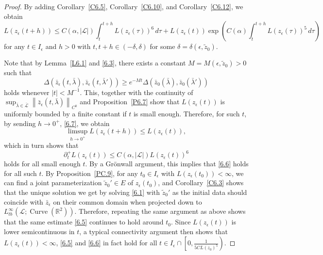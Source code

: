 \documentclass[reqno,centertags,12pt]{amsart}
\theoremstyle{definition}
\numberwithin{equation}{section}
\newcommand{\abs}[1]{\left\lvert#1\right\rvert}
\newcommand{\norm}[1]{\left\|#1\right\|}
\newcommand{\bbR}{{\mathbb{R}}}
\begin{document}
\begin{proof}
    By adding Corollary~\ref{C6.5},
    Corollary~\ref{C6.10}, and
    Corollary~\ref{C6.12}, we obtain
    \begin{equation}\label{6.7}
        L(z_{\epsilon}(t+h)) \leq
        C(\alpha,\abs{\mathcal{L}})\int_{t}^{t+h}L(z_{\epsilon}(\tau))^{6}\,d\tau
        + L(z_{\epsilon}(t))
        \exp\left(C(\alpha)\int_{t}^{t+h}L(z_{\epsilon}(\tau))^{5}\,d\tau\right)
    \end{equation}
    for any $t\in I_{\epsilon}$ and $h>0$ with
    $t,t+h\in (-\delta,\delta)$ for some $\delta=\delta(\epsilon,\tilde{z}_{0})$.

    Note that by Lemma~\ref{L6.1}
    and \eqref{6.3}, there exists a constant
    $M=M(\epsilon,\tilde{z}_{0})>0$ such that
    \[
        \Delta(\bar{z}_{\epsilon}(t,\bar{\lambda}),\bar{z}_{\epsilon}(t,\bar{\lambda}'))
        \geq e^{-Mt}
        \Delta(\bar{z}_{0}(\bar{\lambda}),\bar{z}_{0}(\bar{\lambda}'))
    \]
    holds whenever $\abs{t}<M^{-1}$. This, together with
    the continuity of $\sup_{\bar{\lambda}\in\bar{\mathcal{L}}}
    \norm{\bar{z}_{\epsilon}(t,\bar{\lambda})}_{C^{0}}$ and
    Proposition~\ref{P6.7} show that
    $L(z_{\epsilon}(t))$ is uniformly bounded by a finite constant
    if $t$ is small enough. Therefore, for such $t$, by sending $h\to 0^{+}$,
    \eqref{6.7}, we obtain
    \[
        \limsup_{h\to 0^{+}}L(z_{\epsilon}(t+h)) \leq L(z_{\epsilon}(t)),
    \]
    which in turn shows that
    \[
        \partial_{t}^{+}L(z_{\epsilon}(t))
        \leq C(\alpha,\abs{\mathcal{L}})L(z_{\epsilon}(t))^{6}
    \]
    holds for all small enough $t$. By a Gr\"{o}nwall argument, this implies that
    \eqref{6.6} holds for all such $t$.
    By Proposition~\ref{PC.9}, for any $t_{0}\in I_{\epsilon}$ with
    $L(z_{\epsilon}(t_{0})) < \infty$, we can find a joint parameterization
    $\tilde{z}_{0}'\in E$ of $z_{\epsilon}(t_{0})$, and
    Corollary~\ref{C6.3} shows that
    the unique solution we get by solving \eqref{6.1} with
    $\tilde{z}_{0}'$ as the initial data should coincide with $\bar{z}_{\epsilon}$
    on their common domain when projected down to
    $L_{tb}^{\infty}(\mathcal{L};\operatorname{Curve}(\bbR^{2}))$. Therefore,
    repeating the same argument as above shows that the same estimate
    \eqref{6.5} continues to hold around $t_{0}$.
    Since $L(z_{\epsilon}(t))$ is lower semicontinuous in $t$,
    a typical connectivity argument then shows that
    $L(z_{\epsilon}(t)) < \infty$, \eqref{6.5} and \eqref{6.6} in fact hold for all
    $t\in I_{\epsilon}\cap \left[0, \frac{1}{5CL(z_{0})^{5}}\right)$.
\end{proof}
\end{document}
